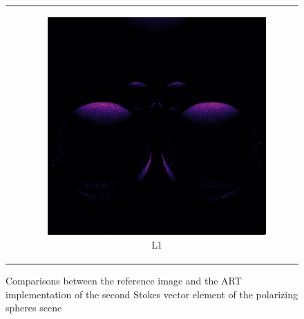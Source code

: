 \begin{figure}[h]
\begin{tabular}{cc}
\begin{subfigure}
			\caption{SSIM}
		\end{subfigure} 
		&
		\begin{subfigure}
			{0.4\textwidth}\centering\includegraphics[width=\linewidth]{img/polarizing_spheres.s1_L1.png}
			\caption{L1}
		\end{subfigure}
	\end{tabular}
	\caption{Comparisons between the reference image and the ART implementation of the second Stokes vector element of the polarizing spheres scene}
	\label{fig:compare_polar_s1}
\end{figure}

